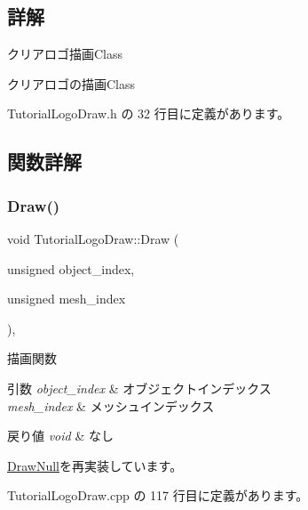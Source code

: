 \subsection{詳解}
クリアロゴ描画\+Class 

クリアロゴの描画\+Class 

 Tutorial\+Logo\+Draw.\+h の 32 行目に定義があります。



\subsection{関数詳解}
\mbox{\label{class_tutorial_logo_draw_aa808cfb8bc59d58bbd698a195603429f}} 
\subsubsection{\texorpdfstring{Draw()}{Draw()}}
{\footnotesize\ttfamily void Tutorial\+Logo\+Draw\+::\+Draw (\begin{DoxyParamCaption}\item[{unsigned}]{object\+\_\+index,  }\item[{unsigned}]{mesh\+\_\+index }\end{DoxyParamCaption})\hspace{0.3cm}{\ttfamily [override]}, {\ttfamily [virtual]}}



描画関数 


\begin{DoxyParams}{引数}
{\em object\+\_\+index} & オブジェクトインデックス \\
\hline
{\em mesh\+\_\+index} & メッシュインデックス \\
\hline
\end{DoxyParams}

\begin{DoxyRetVals}{戻り値}
{\em void} & なし \\
\hline
\end{DoxyRetVals}


\mbox{\hyperlink{class_draw_null_a72ac0b7dc40b1469582419dcc5b0e114}{Draw\+Null}}を再実装しています。



 Tutorial\+Logo\+Draw.\+cpp の 117 行目に定義があります。

\mbox{\label{class_tutorial_logo_draw_a0e56784e25f1f83e6ff167280b801aad}} 
